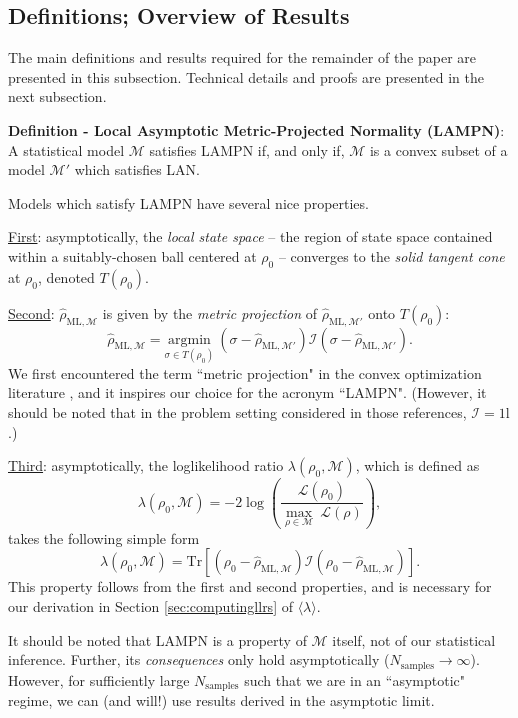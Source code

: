 \documentclass[aps,pra, twocolumn]{revtex4-1}
\newcommand{\M}{\mathcal{M}}
\newcommand{\cL}{\mathcal{L}}
\newcommand{\Id}{\mathbb{I}}
\def\Id{1\!\mathrm{l}}
\newcommand{\rhohat}{\hat{\rho}}
\newcommand{\rhoML}[1]{\rhohat_{\scriptscriptstyle{\mathrm{ML},#1}}}
\begin{document}
\subsection{Definitions; Overview of Results}

The main definitions and results required for the remainder of the paper are presented in this subsection. Technical details and proofs are presented in the next subsection.

\textbf{Definition - Local Asymptotic Metric-Projected Normality (LAMPN)}: A statistical model $\M$ satisfies LAMPN if, and only if, $\M$ is a convex subset of a model $\M'$ which satisfies LAN.

Models which satisfy LAMPN have several nice properties.

\underline{First}: asymptotically, the \emph{local state space} -- the region of state space contained within a suitably-chosen ball centered at $\rho_{0}$ -- converges to the \emph{solid tangent cone} at $\rho_{0}$, denoted $T(\rho_{0})$.

\underline{Second}: $\rhoML{\M}$ is given by the \emph{metric projection} of $\rhoML{\M'}$ onto $T(\rho_{0})$:
\begin{equation}
\label{eq:lampnmle}
\rhoML{\M} = \underset{\sigma \in T(\rho_{0})}{\text{argmin}}~(\sigma  -\rhoML{\M'})\mathcal{I}(\sigma  -\rhoML{\M'}).
\end{equation}
We first encountered the term ``metric projection" in the convex optimization literature \cite{McCoy2014, Amelunxen2014}, and it inspires our choice for the acronym ``LAMPN". (However, it should be noted that in the problem setting considered in those references, $\mathcal{I} = \Id$.)

\underline{Third}: asymptotically, the loglikelihood ratio $\lambda(\rho_{0}, \M)$, which is defined as
\[\lambda(\rho_{0}, \M) = -2 \log \left(\frac{\cL(\rho_{0})}{\underset{\rho \in \M}{\max}~\cL(\rho)}\right),\]
takes the following simple form
\begin{equation}
\label{eq:llrs_lan}
\lambda(\rho_{0}, \M) =  \mathrm{Tr}[(\rho_{0} - \rhoML{\M})\mathcal{I}(\rho_{0} - \rhoML{\M})].
\end{equation}
This property follows from the first and second properties, and is necessary for our derivation in Section \ref{sec:computingllrs} of $\langle \lambda \rangle$.

It should be noted that LAMPN is a property of $\M$ itself, not of our statistical inference. Further, its \emph{consequences} only hold asymptotically ($N_{\mathrm{samples}} \rightarrow \infty$). However, for sufficiently large $N_{\mathrm{samples}}$ such that we are in an ``asymptotic" regime, we can (and will!) use results derived in the asymptotic limit.
\end{document}
